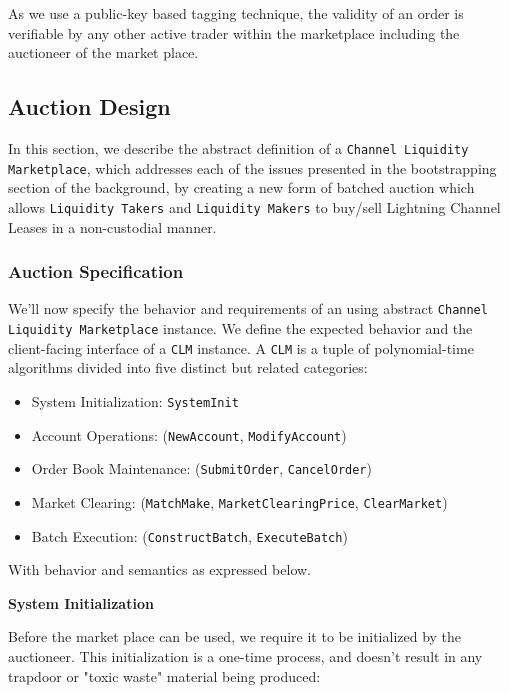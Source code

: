 \documentclass[10pt,a4paper]{article}
\theoremstyle{definition}
\begin{document}
As we use a public-key based tagging technique, the validity of an order is
verifiable by any other active trader within the marketplace including the
auctioneer of the market place.


\subsection{Auction Design}

In this section, we describe the abstract definition of a \texttt{Channel
Liquidity Marketplace}, which addresses each of the issues presented in the
bootstrapping section of the background, by creating a new form of batched
auction which allows \texttt{Liquidity Takers} and \texttt{Liquidity Makers}
to buy/sell Lightning Channel Leases in a non-custodial manner.

\subsubsection{Auction Specification}

We'll now specify the behavior and requirements of an using abstract
\texttt{Channel Liquidity Marketplace} instance. We define the expected
behavior and the client-facing interface of a \texttt{CLM} instance. A
\texttt{CLM} is a tuple of polynomial-time algorithms divided into five
distinct but related categories:
\begin{itemize}
    \item System Initialization: \texttt{SystemInit}
    \item Account Operations: (\texttt{NewAccount}, \texttt{ModifyAccount})
    \item Order Book Maintenance: (\texttt{SubmitOrder}, \texttt{CancelOrder})
    \item Market Clearing: (\texttt{MatchMake}, \texttt{MarketClearingPrice}, \texttt{ClearMarket})
    \item Batch Execution: (\texttt{ConstructBatch}, \texttt{ExecuteBatch})
\end{itemize}


With behavior and semantics as expressed below. \\

\begin{center}
    \textbf{System Initialization}
\end{center}

Before the market place can be used, we require it to be initialized by the
auctioneer. This initialization is a one-time process, and doesn't result in
any trapdoor or "toxic waste" material being produced: \\
\end{document}
